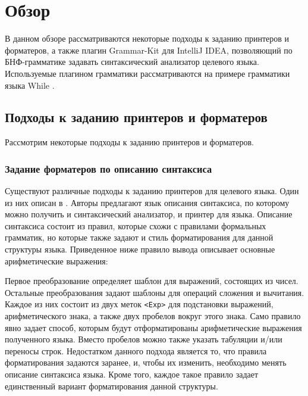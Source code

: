 \section{Обзор}
\lstset{basicstyle=\normalsize\ttfamily, columns=fullflexible}
В данном обзоре рассматриваются некоторые подходы к заданию принтеров и форматеров, а также плагин Grammar-Kit для IntelliJ IDEA, позволяющий по БНФ-грамматике задавать синтаксический анализатор целевого языка.
Используемые плагином грамматики рассматриваются на примере грамматики языка While \cite{paper:nielson}.

\subsection{Подходы к заданию принтеров и форматеров}
Рассмотрим некоторые подходы к заданию принтеров и форматеров.
\subsubsection{Задание форматеров по описанию синтаксиса}%
Существуют различные подходы к заданию принтеров для целевого языка.
Один из них описан в \cite{paper:tbe}.
Авторы предлагают язык описания синтаксиса, по которому можно получить и синтаксический анализатор, и принтер для языка.
Описание синтаксиса состоит из правил, которые схожи с правилами формальных грамматик, но которые также задают и стиль форматирования для данной структуры языка.
Приведенное ниже правило вывода описывает основные арифметические выражения:
{
    
}
\noindent
Первое преобразование определяет шаблон для выражений, состоящих из чисел.
Остальные преобразования задают шаблоны для операций сложения и вычитания.
Каждое из них состоит из двух меток \lstinline{<Exp>} для подстановки выражений, арифметического знака, а также двух пробелов вокруг этого знака.
Само правило явно задает способ, которым будут отформатированы арифметические выражения полученного языка.
Вместо пробелов можно также указать табуляции и/или переносы строк.
Недостатком данного подхода является то, что правила форматирования задаются заранее, и, чтобы их изменить, необходимо менять описание синтаксиса языка.
Кроме того, каждое такое правило задает единственный вариант форматирования данной структуры.

